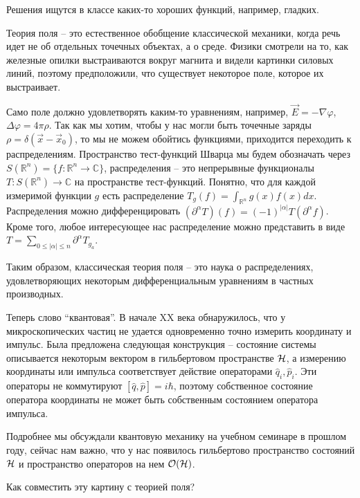 \documentclass[a4paper,12pt]{article}
\theoremstyle{definition}
\begin{document}
Решения ищутся в классе каких-то хороших функций, например, гладких.

Теория поля -- это естественное обобщение классической механики, когда
речь идет не об отдельных точечных объектах, а о среде. Физики
смотрели на то, как железные опилки выстраиваются вокруг магнита и
видели картинки силовых линий, поэтому предположили, что существует
некоторое поле, которое их выстраивает. 

Само поле должно удовлетворять каким-то уравнениям, например, $\vec
E=-\nabla \varphi$, $\Delta \varphi=4\pi \rho$. 
Так как мы хотим, чтобы у нас могли быть точечные заряды
$\rho=\delta(\vec x - \vec x_0)$, то мы не можем обойтись функциями,
приходится переходить к распределениям.
Пространство тест-функций Шварца мы будем обозначать через
$S(\mathbb{R}^n)=\{f:\mathbb{R}^n\to \mathbb{C}\}$, распределения --
это непрерывные функционалы $T:S(\mathbb{R}^n)\to \mathbb{C}$ на
пространстве тест-функций. Понятно, что для каждой измеримой функции
$g$ есть распределение $T_g (f) = \int_{\mathbb{R}^n} g(x) f(x) dx$.
Распределения можно дифференцировать $(\partial^{\alpha} T) (f) =
(-1)^{|\alpha|} T(\partial^{\alpha} f)$. Кроме того, любое
интересующее нас распределение можно представить в виде $T=\sum_{0\leq
  |\alpha| \leq n} \partial^{\alpha} T_{g_a}$.

Таким образом, классическая теория поля -- это наука о
распределениях, удовлетворяющих некоторым дифференциальным уравнениям
в частных производных.  

Теперь слово ``квантовая''. В начале XX века обнаружилось, что у
микроскопических частиц не удается одновременно точно измерить
координату и импульс. Была предложена следующая конструкция --
состояние системы описывается некоторым вектором в гильбертовом
пространстве ${\cal H}$, а измерению координаты или импульса
соответствует действие операторами $\hat q_i, \hat p_i$. Эти операторы
не коммутируют $[\hat q, \hat p]=i \hbar$, поэтому собственное
состояние оператора координаты не может быть собственным состоянием
оператора импульса. 

Подробнее мы обсуждали квантовую механику на учебном семинаре в
прошлом году, сейчас нам важно, что у нас появилось гильбертово
пространство состояний ${\cal H}$ и пространство операторов на нем
${\cal O}({\cal H})$.

Как совместить эту картину с теорией поля?
\end{document}
